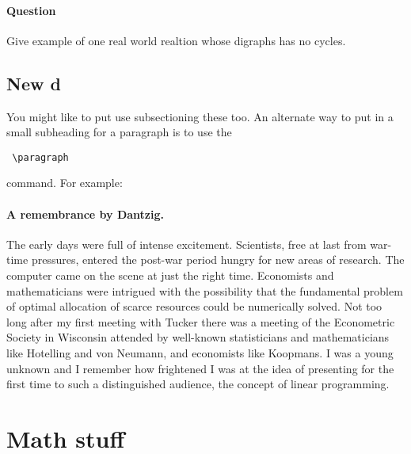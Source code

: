 \paragraph{Question}Give example of one real world realtion whose digraphs has no cycles.


\subsection{New d}

You might like to put use subsectioning these too.  An alternate way to put in a small subheading for a paragraph is to use the \begin{verbatim} \paragraph \end{verbatim} command.  For example:
 
\paragraph{A remembrance by Dantzig.}  The early days were full of intense excitement. Scientists, free at last from war-time pressures, entered the post-war period hungry for new areas of research. The computer came on the scene at just the right time. Economists and mathematicians were intrigued with the possibility that the fundamental problem of optimal allocation of scarce resources could be numerically solved. Not too long after my first meeting with Tucker there was a meeting of the Econometric Society in Wisconsin attended by well-known statisticians and mathematicians like Hotelling and von Neumann, and economists like Koopmans. I was a young unknown and I remember how frightened I was at the idea of presenting for the first time to such a distinguished audience, the concept of linear programming.


\section{Math stuff}



